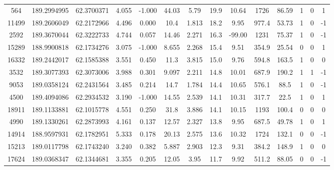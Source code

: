 \begin{table*}
\begin{center}
\begin{tabular}{ cccccccccccccc }
         564 & 189.2994995 &  62.3700371 &  4.055 & -1.000 &     44.03 &      5.79 &    19.9 &   10.64 &      1726 &     86.59 &      1 &      0 &        1 \\ 
       11499 & 189.2606049 &  62.2172966 &  4.496 &  0.000 &      10.4 &     1.813 &    18.2 &    9.95 &     977.4 &     53.73 &      1 &      0 &       -1 \\ 
        2592 & 189.3670044 &  62.3222733 &  4.744 &  0.057 &     14.46 &     2.271 &    16.3 &  -99.00 &      1231 &     75.37 &      1 &      0 &       -1 \\ 
       15289 & 188.9900818 &  62.1734276 &  3.075 & -1.000 &     8.655 &     2.268 &    15.4 &    9.51 &     354.9 &     25.54 &      0 &      0 &        1 \\ 
       16332 & 189.2442017 &  62.1585388 &  3.551 &  0.450 &      11.3 &     3.815 &    15.0 &    9.76 &     594.8 &     163.5 &      1 &      0 &        0 \\ 
        3532 & 189.3077393 &  62.3073006 &  3.988 &  0.301 &     9.097 &     2.211 &    14.8 &   10.01 &     687.9 &     190.2 &      1 &      1 &       -1 \\ 
        9053 & 189.0358124 &  62.2431564 &  3.485 &  0.214 &      14.7 &     1.784 &    14.4 &   10.65 &     576.1 &      88.5 &      1 &      0 &       -1 \\ 
        4500 & 189.4094086 &  62.2934532 &  3.190 & -1.000 &     14.55 &     2.539 &    14.1 &   10.31 &     317.7 &      22.5 &      1 &      0 &        1 \\ 
       18911 & 189.1133881 &  62.1015778 &  4.551 &  0.250 &      31.8 &     3.886 &    14.1 &   10.15 &      1193 &     100.4 &      0 &      0 &        0 \\ 
        4990 & 189.1330261 &  62.2873993 &  4.161 &  0.137 &     12.57 &     2.327 &    13.8 &    9.95 &     687.5 &     49.78 &      1 &      0 &        1 \\ 
       14914 & 188.9597931 &  62.1782951 &  5.333 &  0.178 &     20.13 &     2.575 &    13.6 &   10.32 &      1724 &     132.1 &      0 &      0 &       -1 \\ 
       15213 & 189.0117798 &  62.1743240 &  3.240 &  0.382 &     5.887 &     2.903 &    12.3 &    9.31 &     384.2 &     148.9 &      1 &      0 &        0 \\ 
       17624 & 189.0368347 &  62.1344681 &  3.355 &  0.205 &     12.05 &      3.95 &    11.7 &    9.92 &     511.2 &     88.05 &      0 &      0 &       -1 \\ 

\end{tabular}
\end{center}
\end{table*}
